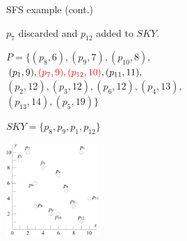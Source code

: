 \documentclass{beamer}
\def\vgap{\vspace{5mm}}
\newcommand{\red}[1]{\textcolor{red}{#1}}
\begin{document}
 \begin{frame}{SFS example (cont.)}
    \begin{small} \label{fra:sfs-sort}
		$p_7$ discarded and $p_{12}$ added to $SKY$.

		\vgap

        \begin{minipage}[b]{0.5\linewidth}
            $P = \{(p_8, 6), (p_9, 7), (p_{10}, 8),$ \\
            $(p_1, 9), \red{(p_7, 9), (p_{12}, 10)}, (p_{11}, 11),$ \\
            $(p_2, 12), (p_3, 12), (p_6, 12), (p_4, 13),$ \\
            $(p_{13}, 14), (p_5, 19)\}$ \vspace{10mm}

			$SKY = \{p_8, p_9, p_1, p_{12}\}$
        \end{minipage}
        \begin{minipage}[b]{0.45\linewidth}
            \begin{center}
                \includegraphics[height=35mm]{./artwork/data.pdf}
            \end{center}
        \end{minipage}
    \end{small}
    \end{frame}
\end{document}
